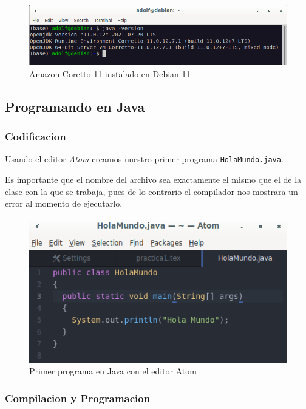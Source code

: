 \documentclass{article}
\begin{document}
		\begin{figure}[H]
			\centering
			\includegraphics[scale = 0.55]{images/terminaljdk}
			\caption{Amazon Coretto 11 instalado en Debian 11}
		\end{figure}

	\subsection{Programando en Java}
	
		\subsubsection{Codificacion}
		
			Usando el editor \emph{Atom} creamos nuestro primer programa \verb*|HolaMundo.java|.
			
			Es importante que el nombre del archivo sea exactamente el mismo que el de la clase con la que se trabaja, pues de lo contrario el compilador nos mostrara un error al momento de ejecutarlo.
			
			\begin{figure}[H]
				\centering
				\includegraphics[scale = 0.8]{images/holamundo}
				\caption{Primer programa en Java con el editor Atom}
			\end{figure}
		
		\subsubsection{Compilacion y Programacion}
		
\end{document}
